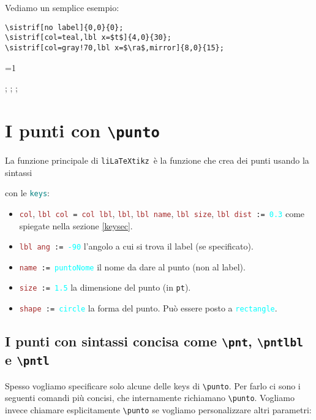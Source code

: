 \documentclass[italian, a4paper]{article}
\def\showimmagini{1} %
\newcommand{\bs}{\textbackslash}
\newcommand{\ttt}[1]{\texttt{#1}}
\newcommand{\liLaTeXtikz}{\ttt{liLaTeXtikz}}
\newcommand{\comandons}[2][\large]{\vspace*{1mm}\noindent\fbox{\parbox{\textwidth}{#1\ttt{#2}}}}
\newcommand{\comando}[2][\large]{\comandons[#1]{#2}\vspace*{3mm}}
\newcommand{\blue}[1]{\textcolor{blue}{#1}}
\newcommand{\cyan}[1]{\textcolor{cyan}{#1}}
\newcommand{\keys}{\textcolor{teal}{\ttt{keys}}}
\newcommand{\key}[1]{\textcolor{brown}{\ttt{#1}}}
\newcommand{\keyval}[1]{\cyan{\ttt{#1}}}
\begin{document}
Vediamo un semplice esempio:

\begin{Verbatim}[frame=single]
\sistrif[no label]{0,0}{0};
\sistrif[col=teal,lbl x=$t$]{4,0}{30};
\sistrif[col=gray!70,lbl x=$\ra$,mirror]{8,0}{15};
\end{Verbatim}
\vspace*{-4mm}

\ifnum\showimmagini=1
\begin{immagine}
;
;
;
\end{immagine}
\fi

\newpage
\section{I punti con \ttt{\bs punto}}
La funzione principale di \liLaTeXtikz\ è la funzione che crea dei punti usando la sintassi

\comando{\bs punto[\keys]\{\blue{coordinate}\};}

con le \keys:
\begin{itemize}[nolistsep]
\item \key{col}, \ttt{\key{lbl col} = \key{col lbl}}, \key{lbl}, \key{lbl name}, \key{lbl size}, \ttt{\key{lbl dist} := \keyval{0.3}} come spiegate nella sezione \ref{keysec}.
\item \ttt{\key{lbl ang} := \keyval{-90}} l'angolo a cui si trova il label (se specificato).
\item \ttt{\key{name} := \keyval{puntoNome}} il nome da dare al punto (non al label).
\item \ttt{\key{size} := \keyval{1.5}} la dimensione del punto (in \ttt{pt}).
\item \ttt{\key{shape} := \keyval{circle}} la forma del punto. Può essere posto a \keyval{rectangle}.
\end{itemize}

\subsection{I punti con sintassi concisa come \ttt{\bs pnt}, \ttt{\bs pntlbl} e \ttt{\bs pntl}}

Spesso vogliamo specificare solo alcune delle keys di \ttt{\bs punto}. Per farlo ci sono i seguenti comandi più concisi, che internamente richiamano \ttt{\bs punto}. Vogliamo invece chiamare esplicitamente \ttt{\bs punto} se vogliamo personalizzare altri parametri:
\end{document}
